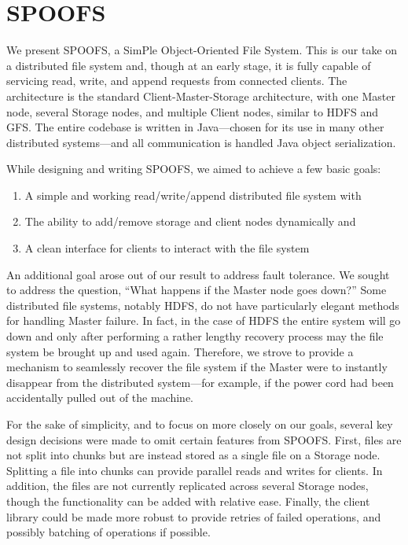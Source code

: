 \section{SPOOFS}
\label{sec:spoofs}

We present SPOOFS, a SimPle Object-Oriented File System. This is our take on a distributed file system and, though at an early stage, it is fully capable of servicing read, write, and append requests from connected clients. The architecture is the standard Client-Master-Storage architecture, with one Master node, several Storage nodes, and multiple Client nodes, similar to HDFS and GFS. The entire codebase is written in Java---chosen for its use in many other distributed systems---and all communication is handled Java object serialization.

While designing and writing SPOOFS, we aimed to achieve a few basic goals:
\begin{enumerate}
\item A simple and working read/write/append distributed file system with
\item The ability to add/remove storage and client nodes dynamically and
\item A clean interface for clients to interact with the file system
\end{enumerate}
An additional goal arose out of our result to address fault tolerance.  We sought to address the question, ``What happens if the Master node goes down?'' Some distributed file systems, notably HDFS, do not have particularly elegant methods for handling Master failure. In fact, in the case of HDFS the entire system will go down and only after performing a rather lengthy recovery process may the file system be brought up and used again. Therefore, we strove to provide a mechanism to seamlessly recover the file system if the Master were to instantly disappear from the distributed system---for example, if the power cord had been accidentally pulled out of the machine.

For the sake of simplicity, and to focus on more closely on our goals, several key design decisions were made to omit certain features from SPOOFS.  First, files are not split into chunks but are instead stored as a single file on a Storage node. Splitting a file into chunks can provide parallel reads and writes for clients.  In addition, the files are not currently replicated across several Storage nodes, though the functionality can be added with relative ease. Finally, the client library could be made more robust to provide retries of failed operations, and possibly batching of operations if possible.

